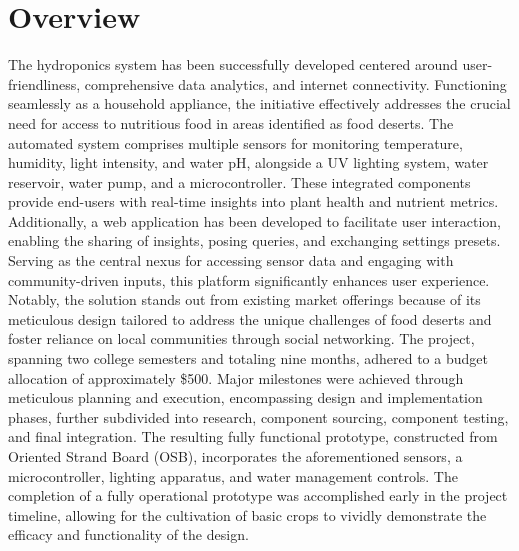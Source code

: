 \documentclass[12pt]{article} %
\newcommand{\comment}[1]{} %
\begin{document}
\section*{Overview}
The hydroponics system has been successfully developed centered around user-friendliness, comprehensive data analytics, and internet connectivity. Functioning seamlessly as a household appliance, the initiative effectively addresses the crucial need for access to nutritious food in areas identified as food deserts. The automated system comprises multiple sensors for monitoring temperature, humidity, light intensity, and water pH, alongside a UV lighting system, water reservoir, water pump, and a microcontroller. These integrated components provide end-users with real-time insights into plant health and nutrient metrics.
\newline
\newline
\noindent Additionally, a web application has been developed to facilitate user interaction, enabling the sharing of insights, posing queries, and exchanging settings presets. Serving as the central nexus for accessing sensor data and engaging with community-driven inputs, this platform significantly enhances user experience. Notably, the solution stands out from existing market offerings because of its meticulous design tailored to address the unique challenges of food deserts and foster reliance on local communities through social networking.
\newline
\newline
\noindent The project, spanning two college semesters and totaling nine months, adhered to a budget allocation of approximately \$500. Major milestones were achieved through meticulous planning and execution, encompassing design and implementation phases, further subdivided into research, component sourcing, component testing, and final integration. The resulting fully functional prototype, constructed from Oriented Strand Board (OSB), incorporates the aforementioned sensors, a microcontroller, lighting apparatus, and water management controls. The completion of a fully operational prototype was accomplished early in the project timeline, allowing for the cultivation of basic crops to vividly demonstrate the efficacy and functionality of the design.

\comment{


\section*{Dedication}
\addcontentsline{toc}{section}{Dedication}
\lipsum[1] %


}
\end{document}
